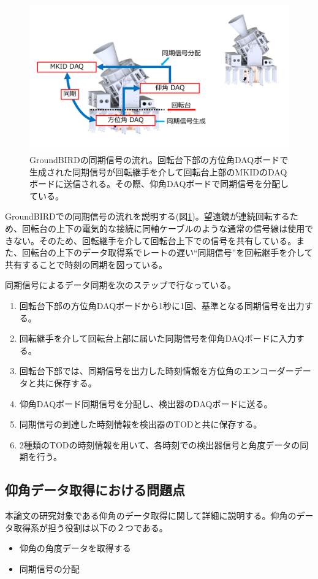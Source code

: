 \begin{figure}[htbp]
  \centering
  \includegraphics[width=0.9\columnwidth]{4_elDAQ/figs/GB_sync_2.pdf}
  \caption{GroundBIRDの同期信号の流れ。回転台下部の方位角DAQボードで生成された同期信号が回転継手を介して回転台上部のMKIDのDAQボードに送信される。その際、仰角DAQボードで同期信号を分配している。}
  \label{GB_sync}
\end{figure}

GroundBIRDでの同期信号の流れを説明する(図\ref{GB_sync})。望遠鏡が連続回転するため、回転台の上下の電気的な接続に同軸ケーブルのような通常の信号線は使用できない。そのため、回転継手を介して回転台上下での信号を共有している。また、回転台の上下のデータ取得系でレートの遅い``同期信号''を回転継手を介して共有することで時刻の同期を図っている。

同期信号によるデータ同期を次のステップで行なっている。
\begin{enumerate}
  \item 回転台下部の方位角DAQボードから1秒に1回、基準となる同期信号を出力する。
  \item 回転継手を介して回転台上部に届いた同期信号を仰角DAQボードに入力する。
  \item 回転台下部では、同期信号を出力した時刻情報を方位角のエンコーダーデータと共に保存する。
  \item 仰角DAQボード同期信号を分配し、検出器のDAQボードに送る。
  \item 同期信号の到達した時刻情報を検出器のTODと共に保存する。
  \item 2種類のTODの時刻情報を用いて、各時刻での検出器信号と角度データの同期を行う。
\end{enumerate}

\subsection{仰角データ取得における問題点}
本論文の研究対象である仰角のデータ取得に関して詳細に説明する。仰角のデータ取得系が担う役割は以下の２つである。
\begin{itemize}
  \item 仰角の角度データを取得する
  \item 同期信号の分配
\end{itemize}

